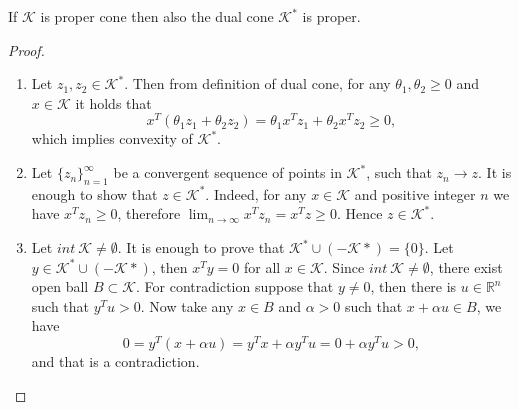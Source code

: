 \documentclass[12pt]{book}
\theoremstyle{definition}
\begin{document}
\begin{appendix}
\cor \label{DualOfAProperConeCorr}
If $\mathcal{K}$ is proper cone then also the dual cone $\mathcal{K}^*$ is proper.

\begin{proof}
\begin{enumerate}
\item Let $z_1,z_2 \in  \mathcal{K}^*$. Then from definition of dual cone, for any $\theta_1,\theta_2 \geq 0$ and $x \in \mathcal{K}$ it holds that
\begin{equation*}
x^T(\theta_1z_1 + \theta_2z_2) = \theta_1x^Tz_1 + \theta_2x^Tz_2 \geq 0,
\end{equation*}
which implies convexity of $\mathcal{K}^*$.%

\item Let $\{z_n\}_{n=1}^\infty$ be a convergent sequence of points in $\mathcal{K}^*$, such that 
$z_n\rightarrow z$. It is enough to show that $z\in \mathcal{K}^*.$  Indeed, for any $x\in \mathcal{K}$ and positive integer $n$ we have $x^Tz_n \geq 0$, therefore
$\lim_{n\rightarrow \infty} x^Tz_n = x^Tz \geq 0$. Hence $z\in \mathcal{K}^*.$

\item Let $int \ \mathcal{K}\neq \emptyset$. It is enough to prove that $\mathcal{K}^* \cup (-\mathcal{K}*) = \{0\}.$ Let $y\in \mathcal{K}^* \cup (-\mathcal{K}*)$, then 
$x^Ty = 0 $ for all $x\in \mathcal{K}$. Since $int \ \mathcal{K}\neq \emptyset$, there exist open ball $B\subset \mathcal{K}$. For contradiction suppose that $y\neq 0$, then there is $u\in \mathbb{R}^n$ such that $y^Tu>0$. Now take any $x\in B$ and $\alpha>0$ such that $x+\alpha u\in B$, we have 
$$ 0 = y^T(x+\alpha u) = y^Tx + \alpha y^Tu = 0 + \alpha y^Tu > 0,$$
and that is a contradiction.



\end{enumerate}
\end{proof}
\end{appendix}
\end{document}
